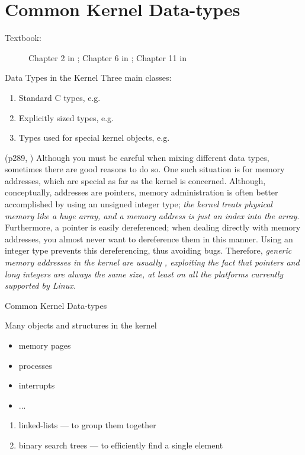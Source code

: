 \section{Common Kernel Data-types}
\label{sec:comm-kern-datatyp}

\begin{description}
\item[Textbook:] Chapter 2 in \cite{rodriguez2005linux}; Chapter 6 in
  \cite{love2010linux}; Chapter 11 in \cite{corbet05ldd}
\end{description}

\begin{frame}{Data Types in the Kernel}
  Three main classes:
  \begin{enumerate}
  \item Standard C types, e.g. 
  \item Explicitly sized types, e.g. 
  \item Types used for special kernel objects, e.g. 
  \end{enumerate}

\end{frame}

(p289, \cite{corbet05ldd}) Although you must be careful when mixing different data types,
sometimes there are good reasons to do so. One such situation is for memory addresses,
which are special as far as the kernel is concerned. Although, conceptually, addresses are
pointers, memory administration is often better accomplished by using an unsigned integer
type; \emph{the kernel treats physical memory like a huge array, and a memory address is
  just an index into the array}. Furthermore, a pointer is easily dereferenced; when
dealing directly with memory addresses, you almost never want to dereference them in this
manner. Using an integer type prevents this dereferencing, thus avoiding bugs.  Therefore,
\emph{generic memory addresses in the kernel are usually , exploiting
  the fact that pointers and long integers are always the same size, at least on all the
  platforms currently supported by Linux.}

\begin{frame}{Common Kernel Data-types}
  \begin{block}{Many objects and structures in the kernel}
    \begin{itemize}
    \item memory pages
    \item processes
    \item interrupts
    \item ...
    \end{itemize}
    \begin{enumerate}
    \item linked-lists --- to group them together
    \item binary search trees --- to efficiently find a single element
    \end{enumerate}
  \end{block}
\end{frame}

